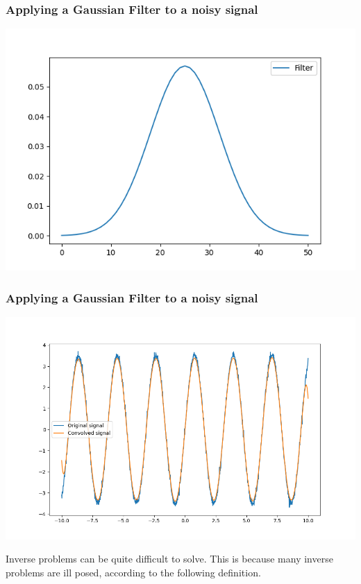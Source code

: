 \documentclass{beamer}
\begin{document}
\begin{frame}
	\frametitle{Applying a Gaussian Filter to a noisy signal}
	\center
\includegraphics[scale= 0.5]{media/gaussian.png}
\end{frame}
\begin{frame}
	\frametitle{Applying a Gaussian Filter to a noisy signal}
	\center
\includegraphics[scale= 0.4]{media/noise_mixed.png}
\end{frame}

\begin{frame}
	\center
Inverse problems can be quite difficult to solve.
This is because many inverse problems are ill posed, according to the following definition.
\end{frame}
\end{document}
